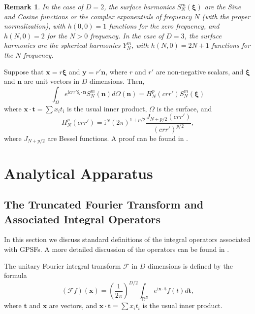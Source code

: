 \documentclass[12pt]{article}
\newtheorem{remark}{Remark}
\begin{document}
\begin{remark}
In the case of $D=2$, the surface harmonics $S_N^m({\bm \xi})$ are the Sine and Cosine functions or the complex exponentials of frequency $N$ (with the proper normalization),
with $h(0,0)=1$ functions for the zero frequency, and $h(N,0)=2$ for the $N>0$ frequency. 
In the case of $D=3$, the surface harmonics are the spherical harmonics $Y_N^m$, with $h(N,0)=2N+1$ functions for the $N$ frequency. 
\end{remark}

Suppose that ${\bm x}= r {\bm \xi}$ and ${\bm y}= r'{\bm n}$, where $r$ and $r'$ are non-negative scalars, and ${\bm \xi}$ and ${\bm n}$ are unit vectors in $D$ dimensions. 
Then,
\begin{equation}\label{eq:exp_bessel}
  \int_\Omega e^{\mathrm{i} c r r' {\bm \xi} \cdot {\bm n}} S_N^m({\bm n}) d\Omega({\bm n})    = H^p_N(crr') S_N^m({\bm \xi})
\end{equation}
where  $ {\bm{x}} \cdot {\bm{t}} = \sum{x_i t_i} $ is the usual inner product,
$\Omega$ is the surface, 
and
\begin{equation}
H^p_N(crr') = \mathrm{i}^N (2 \pi)^{1+p/2} \frac{J_{N+p/2}(crr')}{(crr')^{p/2}},
\end{equation}
where $J_{N+p/2}$ are Bessel functions.
A proof can be found in \cite{slepian1964prolate}.








\section{Analytical Apparatus}\label{sec:analysis}

%
%
%
\subsection{The Truncated Fourier Transform and Associated Integral Operators}\label{sec:truncated_fourier}

In this section we discuss standard definitions of the integral operators associated with GPSFs.
A more detailed discussion of the operators can be found in \cite{slepian1964prolate,serkh2015generalized}.

The unitary Fourier integral transform $\mathcal{F}$ in $D$ dimensions is defined by the formula
\begin{equation}\label{eq:def:Fourier}
  \left(\mathcal{F} f \right)({\bm x}) = \left(\frac{1}{2 \pi }\right)^{D/2} \int_{\mathbb{R}^D} e^{ \mathrm{i}  {\bm{x}} \cdot {\bm{t}}  } f(t)  {d}{\bm t} ,
\end{equation}
where ${\bm t}$ and ${\bm x}$ are vectors, and $ {\bm{x}} \cdot {\bm{t}} = \sum{x_i t_i} $ is the usual inner product.
\end{document}
